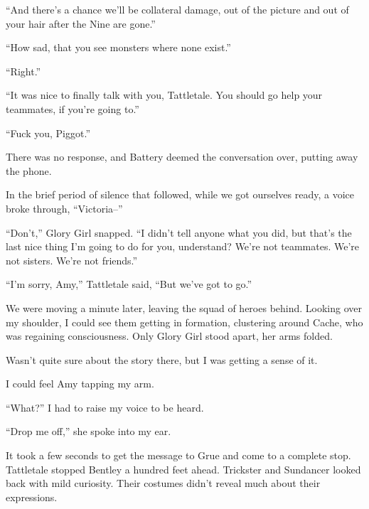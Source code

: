 ``And there's a chance we'll be collateral damage, out of the picture and out of your hair after the Nine are gone.''



``How sad, that you see monsters where none exist.''



``Right.''



``It was nice to finally talk with you, Tattletale.  You should go help your teammates, if you're going to.''



``Fuck you, Piggot.''



There was no response, and Battery deemed the conversation over, putting away the phone.



In the brief period of silence that followed, while we got ourselves ready, a voice broke through, ``Victoria--''



``Don't,'' Glory Girl snapped.  ``I didn't tell anyone what you did, but that's the last nice thing I'm going to do for you, understand?  We're not teammates.  We're not sisters.  We're not friends.''



``I'm sorry, Amy,'' Tattletale said, ``But we've got to go.''



We were moving a minute later, leaving the squad of heroes behind.  Looking over my shoulder, I could see them getting in formation, clustering around Cache, who was regaining consciousness.  Only Glory Girl stood apart, her arms folded.



Wasn't quite sure about the story there, but I was getting a sense of it.



I could feel Amy tapping my arm.



``What?'' I had to raise my voice to be heard.



``Drop me off,'' she spoke into my ear.



It took a few seconds to get the message to Grue and come to a complete stop.  Tattletale stopped Bentley a hundred feet ahead.  Trickster and Sundancer looked back with mild curiosity.  Their costumes didn't reveal much about their expressions.



